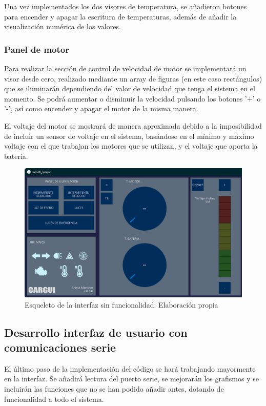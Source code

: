 Una vez implementados los dos visores de temperatura, se añadieron botones para encender y apagar la escritura de temperaturas, además de añadir la visualización numérica de los valores.

\subsubsection{Panel de motor}

Para realizar la sección de control de velocidad de motor se implementará un visor desde cero, realizado mediante un array de figuras (en este caso rectángulos) que se iluminarán dependiendo del valor de velocidad que tenga el sistema en el momento. Se podrá aumentar o disminuir la velocidad pulsando los botones '+' o '-', así como encender y apagar el motor de la misma manera. 

El voltaje del motor se mostrará de manera aproximada debido a la imposibilidad de incluir un sensor de voltaje en el sistema, basándose en el mínimo y máximo voltaje con el que trabajan los motores que se utilizan, y el voltaje que aporta la batería. 

\begin{figure}[H]
    \centering
    \includegraphics[width=1\textwidth]{imagenes/cargui_simple.png}
    \caption{Esqueleto de la interfaz sin funcionalidad. Elaboración propia}
\end{figure}



\subsection{Desarrollo interfaz de usuario con comunicaciones serie}

El último paso de la implementación del código se hará trabajando mayormente en la interfaz. Se añadirá lectura del puerto serie, se mejorarán los grafismos y se incluirán las funciones que no se han podido añadir antes, dotando de funcionalidad a todo el sistema. 

